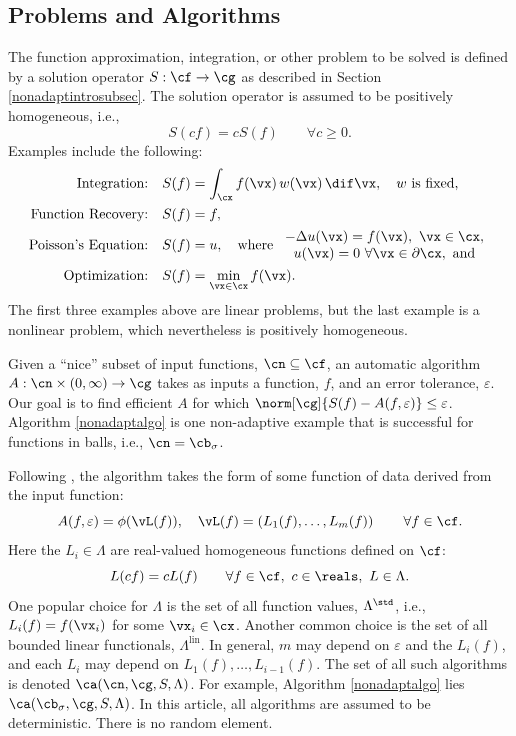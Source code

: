 \documentclass[]{elsarticle}
\DeclareMathOperator{\lin}{lin}
\theoremstyle{definition}
\theoremstyle{remark}
\begin{document}
\subsection{Problems and Algorithms} The function approximation, integration, or other problem to be solved is defined by a solution operator $S:\cf \to \cg$ as described in Section \ref{nonadaptintrosubsec}. The solution operator is assumed to be positively homogeneous, i.e., 
\[
S(cf) = cS(f) \qquad \forall c\ge 0.
\]
Examples include the following:
\begin{align*}
\text{Integration:} \quad & S(f) = \int_{\cx} f(\vx) \, w(\vx) \, \dif \vx, \quad w \text{ is fixed,}\\
\text{Function Recovery:} \quad & S(f) = f, \\
\text{Poisson's Equation:} \quad & S(f) = u, \quad \text{where } \begin{array}{c} -\Delta u(\vx) = f(\vx), \ \vx \in \cx, \\ u(\vx)=0 \ \forall \vx \in \partial \cx, \text{ and}\end{array} \\
\text{Optimization:} \quad & S(f) = \min_{\vx \in \cx} f(\vx).
\end{align*}
The first three examples above are linear problems, but the last example is a nonlinear problem, which nevertheless is positively homogeneous.

Given a ``nice'' subset of input functions, $\cn \subseteq \cf$, an automatic algorithm $A:\cn\times(0,\infty) \to \cg$ takes as inputs a function, $f$, and an error tolerance, $\varepsilon$.  Our goal is to find efficient $A$ for which $\norm[\cg]{S(f)-A(f,\varepsilon)}\le \varepsilon$.  Algorithm \ref{nonadaptalgo} is one non-adaptive example that is successful for functions in balls, i.e., $\cn=\cb_{\sigma}$.

Following \cite[Section 3.2]{TraWasWoz88}, the algorithm takes the form of some function of data derived from the input function:
\begin{equation*}
\label{algoform}
A(f,\varepsilon) =  \phi(\vL(f)), \quad \vL(f) = \left(L_1(f), \ldots, L_m(f)\right) \qquad \forall f \in \cf.
\end{equation*}
Here the $L_i \in \Lambda$ are real-valued homogeneous functions defined on $\cf$:
\begin{equation*}
\label{dataassump}
L(cf) = cL(f) \qquad \forall f \in \cf, \ c \in \reals, \ L \in \Lambda.
\end{equation*}
One popular choice for $\Lambda$ is the set of all function values, $\Lambda^{\std}$, i.e., $L_i(f) = f(\vx_i)$ for some $\vx_i \in \cx$.  Another common choice is the set of all bounded linear functionals, $\Lambda^{\lin}$.  In general, $m$ may depend on  $\varepsilon$ and the $L_i(f)$, and each $L_i$ may depend on $L_1(f), \ldots, L_{i-1}(f)$.  The set of all such algorithms is denoted $\ca(\cn,\cg,S,\Lambda)$. For example, Algorithm \ref{nonadaptalgo} lies $\ca(\cb_{\sigma},\cg,S,\Lambda)$.  In this article, all algorithms are assumed to be deterministic.  There is no random element.
\end{document}
